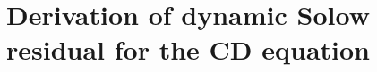 \documentclass[preprint,authoryear,12pt]{elsarticle}\usepackage[]{graphicx}\usepackage[]{color}
\begin{document}
% 
% 










\appendix


\section{Derivation of dynamic Solow residual for the CD equation}
\label{sec:dynamic_sr_CD}
\end{document}
